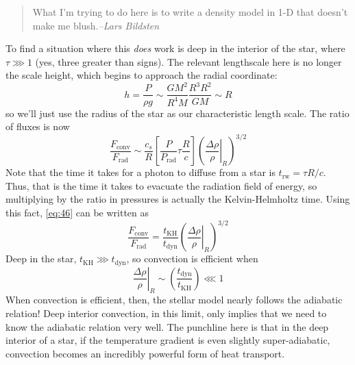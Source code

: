 \documentclass[10pt]{article}
\numberwithin{equation}{section}
\begin{document}
  \begin{quote}
    What I'm trying to do here is to write a density model in 1-D that
    doesn't make me blush.\hfill \emph{--Lars Bildsten}
  \end{quote}
  To find a situation where this \emph{does} work is deep in the
  interior of the star, where $\tau \ggg 1$ (yes, three greater than
  signs). The relevant lengthscale here is no longer the scale height,
  which begins to approach the radial coordinate:
  \begin{equation}
    \label{eq:45}
    h=\frac{P}{\rho g}\sim\frac{GM^2}{R^4M}\frac{R^3R^2}{GM}\sim R
  \end{equation}
  so we'll just use the radius of the star as our characteristic
  length scale. The ratio of fluxes is now 
  \begin{equation}
    \label{eq:46}
    \frac{F_{\mathrm{conv}}}{F_{\mathrm{rad}}}\sim \frac{c_s}{R}\left[\frac{P}{P_{\mathrm{rad}}}\tau\frac{R}{c}\right]\left(\left.\frac{\Delta\rho}{\rho}\right|_{R}\right)^{3/2}
  \end{equation}
  Note that the time it takes for a photon to diffuse from a star is
  $t_{\mathrm{rw}}=\tau R/c$. Thus, that is the time it takes to
  evacuate the radiation field of energy, so multiplying by the ratio
  in pressures is actually the Kelvin-Helmholtz time. Using this fact,
  \eqref{eq:46} can be written as
  \begin{equation}
    \label{eq:47}
    \frac{F_{\mathrm{conv}}}{F_{\mathrm{rad}}}=\frac{t_{\mathrm{KH}}}{t_{\mathrm{dyn}}}\left(\left.\frac{\Delta\rho}{\rho}\right|_{R}\right)^{3/2}
  \end{equation}
  Deep in the star, $t_{\mathrm{KH}}\ggg t_{\mathrm{dyn}}$, so
  convection is efficient when
  \begin{equation}
    \label{eq:48}
    \left.\frac{\Delta\rho}{\rho}\right|_R\sim\left(\frac{t_{\mathrm{dyn}}}{t_{\mathrm{KH}}}\right)\lll 1
  \end{equation}
  When convection is efficient, then, the stellar model nearly follows
  the adiabatic relation! Deep interior convection, in this limit,
  only implies that we need to know the adiabatic relation very
  well. The punchline here is that in the deep interior of a star, if
  the temperature gradient is even slightly super-adiabatic,
  convection becomes an incredibly powerful form of heat transport.\\
\end{document}
